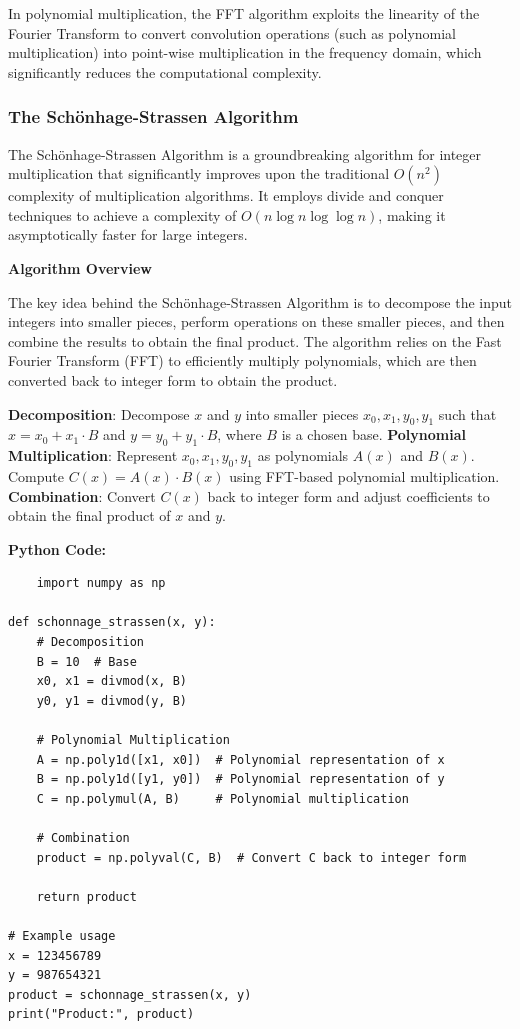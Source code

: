 \documentclass[12pt]{book} %
\begin{document}
In polynomial multiplication, the FFT algorithm exploits the linearity of the Fourier Transform to convert convolution operations (such as polynomial multiplication) into point-wise multiplication in the frequency domain, which significantly reduces the computational complexity.

\subsubsection{The Schönhage-Strassen Algorithm}

The Schönhage-Strassen Algorithm is a groundbreaking algorithm for integer multiplication that significantly improves upon the traditional \(O(n^2)\) complexity of multiplication algorithms. It employs divide and conquer techniques to achieve a complexity of \(O(n \log n \log \log n)\), making it asymptotically faster for large integers.

\textbf{Algorithm Overview}

The key idea behind the Schönhage-Strassen Algorithm is to decompose the input integers into smaller pieces, perform operations on these smaller pieces, and then combine the results to obtain the final product. The algorithm relies on the Fast Fourier Transform (FFT) to efficiently multiply polynomials, which are then converted back to integer form to obtain the product.

\begin{algorithm}[H]
\caption{Schönhage-Strassen Algorithm for Integer Multiplication}
\begin{algorithmic}[1]
    \State \textbf{Decomposition}:
    \State Decompose $x$ and $y$ into smaller pieces $x_0, x_1, y_0, y_1$ such that $x = x_0 + x_1 \cdot B$ and $y = y_0 + y_1 \cdot B$, where $B$ is a chosen base.
    \State \textbf{Polynomial Multiplication}:
    \State Represent $x_0, x_1, y_0, y_1$ as polynomials $A(x)$ and $B(x)$.
    \State Compute $C(x) = A(x) \cdot B(x)$ using FFT-based polynomial multiplication.
    \State \textbf{Combination}:
    \State Convert $C(x)$ back to integer form and adjust coefficients to obtain the final product of $x$ and $y$.
\EndProcedure
\end{algorithmic}
\end{algorithm}

\textbf{Python Code:}
\FloatBarrier
\begin{lstlisting}
    import numpy as np

def schonnage_strassen(x, y):
    # Decomposition
    B = 10  # Base
    x0, x1 = divmod(x, B)
    y0, y1 = divmod(y, B)
    
    # Polynomial Multiplication
    A = np.poly1d([x1, x0])  # Polynomial representation of x
    B = np.poly1d([y1, y0])  # Polynomial representation of y
    C = np.polymul(A, B)     # Polynomial multiplication
    
    # Combination
    product = np.polyval(C, B)  # Convert C back to integer form
    
    return product

# Example usage
x = 123456789
y = 987654321
product = schonnage_strassen(x, y)
print("Product:", product)
\end{lstlisting}
\end{document}
